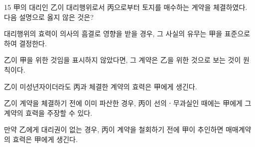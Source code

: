 \begin{question}{15}
甲의 대리인 乙이 대리행위로서 丙으로부터 토지를 매수하는 계약을 체결하였다. 다음 설명으로 옳지 않은 것은?
\begin{choices}
  \item 대리행위의 효력이 의사의 흠결로 영향을 받을 경우, 그 사실의 유무는 甲을 표준으로 하여 결정한다.
  \item 乙이 甲을 위한 것임을 표시하지 않았다면, 그 계약은 乙을 위한 것으로 보는 것이 원칙이다.
  \item 乙이 미성년자이더라도 丙과 체결한 계약의 효력은 甲에게 생긴다.
  \item 乙이 계약을 체결하기 전에 이미 파산한 경우, 丙이 선의ㆍ무과실인 때에는 甲에게 그 계약의 효력을 주장할 수 있다.
  \item 만약 乙에게 대리권이 없는 경우, 丙이 계약을 철회하기 전에 甲이 추인하면 매매계약의 효력은 甲에게 생긴다.
\end{choices}
\end{question}
